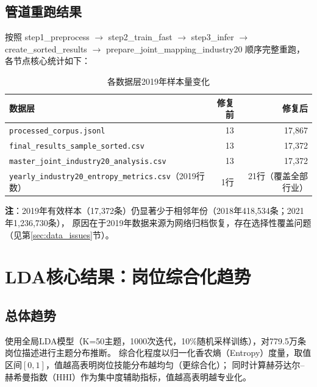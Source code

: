 \documentclass[12pt,a4paper]{ctexart}
\begin{document}
\subsection{管道重跑结果}

按照 step1\_preprocess $\to$ step2\_train\_fast $\to$ step3\_infer $\to$ create\_sorted\_results $\to$ prepare\_joint\_mapping\_industry20 顺序完整重跑，各节点核心统计如下：

\begin{table}[H]
\centering
\caption{各数据层2019年样本量变化}
\begin{tabular}{lrr}
\toprule
数据层 & 修复前 & 修复后 \\
\midrule
\texttt{processed\_corpus.jsonl} & 13 & 17,867 \\
\texttt{final\_results\_sample\_sorted.csv} & 13 & 17,372 \\
\texttt{master\_joint\_industry20\_analysis.csv} & 13 & 17,372 \\
\texttt{yearly\_industry20\_entropy\_metrics.csv}（2019行数） & 1行 & 21行（覆盖全部行业） \\
\bottomrule
\end{tabular}
\end{table}

\textbf{注}：2019年有效样本（17,372条）仍显著少于相邻年份（2018年418,534条；2021年1,236,730条），
原因在于2019年数据来源为网络归档恢复，存在选择性覆盖问题（见第\ref{sec:data_issues}节）。

\section{LDA核心结果：岗位综合化趋势}

\subsection{总体趋势}

使用全局LDA模型（K=50主题，1000次迭代，10\%随机采样训练），对779.5万条岗位描述进行主题分布推断。
综合化程度以归一化香农熵（Entropy）度量，取值区间$[0,1]$，值越高表明岗位技能分布越均匀（更综合化）；
同时计算赫芬达尔--赫希曼指数（HHI）作为集中度辅助指标，值越高表明越专业化。
\end{document}
